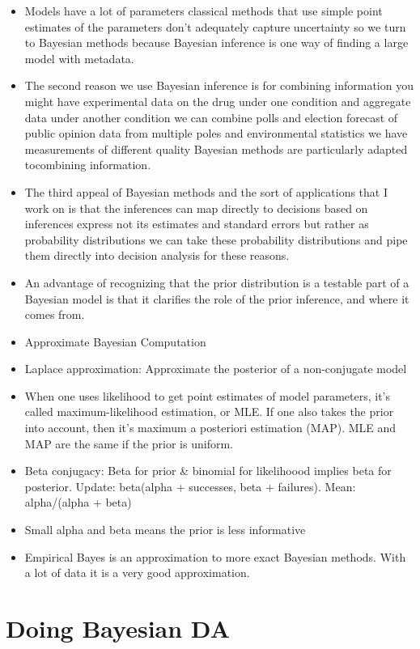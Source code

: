 \documentclass[]{book}
\begin{document}
\begin{itemize}
\item
  Models have a lot of parameters classical methods that use simple point estimates of the parameters don't adequately capture uncertainty so we turn to Bayesian methods because Bayesian inference is one way of finding a large model with metadata.
\item
  The second reason we use Bayesian inference is for combining information you might have experimental data on the drug under one condition and aggregate data under another condition we can combine polls and election forecast of public opinion data from multiple poles and environmental statistics we have measurements of different quality Bayesian methods are particularly adapted tocombining information.
\item
  The third appeal of Bayesian methods and the sort of applications that I work on is that the inferences can map directly to decisions based on inferences express not its estimates and standard errors but rather as probability distributions we can take these probability distributions and pipe them directly into decision analysis for these reasons.
\item
  An advantage of recognizing that the prior distribution is a testable part of a Bayesian model is that it clarifies the role of the prior inference, and where it comes from.
\item
  Approximate Bayesian Computation
\item
  Laplace approximation: Approximate the posterior of a non-conjugate model
\item
  When one uses likelihood to get point estimates of model parameters, it's called maximum-likelihood estimation, or MLE. If one also takes the prior into account, then it's maximum a posteriori estimation (MAP). MLE and MAP are the same if the prior is uniform.
\item
  Beta conjugacy: Beta for prior \& binomial for likelihoood implies beta for posterior. Update: beta(alpha + successes, beta + failures). Mean: alpha/(alpha + beta)
\item
  Small alpha and beta means the prior is less informative
\item
  Empirical Bayes is an approximation to more exact Bayesian methods. With a lot of data it is a very good approximation.
\end{itemize}

\hypertarget{doing-bayesian-da}{%
\section{Doing Bayesian DA}\label{doing-bayesian-da}}
\end{document}
